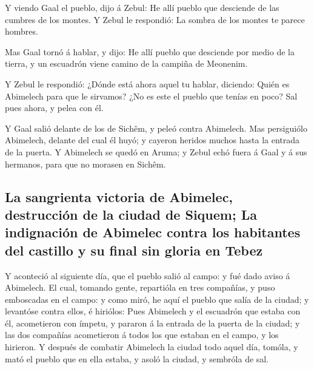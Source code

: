  Y viendo Gaal el pueblo, dijo á Zebul: He allí pueblo
que desciende de las cumbres de los montes. Y Zebul le respondió: La
sombra de los montes te parece hombres.

 Mas Gaal tornó á hablar, y dijo: He allí pueblo que
desciende por medio de la tierra, y un escuadrón viene camino de la
campiña de Meonenim.

 Y Zebul le respondió: ¿Dónde está ahora aquel tu hablar,
diciendo: Quién es Abimelech para que le sirvamos? ¿No es este el pueblo
que tenías en poco? Sal pues ahora, y pelea con él.

 Y Gaal salió delante de los de Sichêm, y peleó contra
Abimelech.  Mas persiguiólo Abimelech, delante del cual
él huyó; y cayeron heridos muchos hasta la entrada de la puerta.
 Y Abimelech se quedó en Aruma; y Zebul echó fuera á Gaal
y á sus hermanos, para que no morasen en Sichêm.

\hypertarget{la-sangrienta-victoria-de-abimelec-destrucciuxf3n-de-la-ciudad-de-siquem-la-indignaciuxf3n-de-abimelec-contra-los-habitantes-del-castillo-y-su-final-sin-gloria-en-tebez}{%
\subsection{La sangrienta victoria de Abimelec, destrucción de la ciudad
de Siquem; La indignación de Abimelec contra los habitantes del castillo
y su final sin gloria en
Tebez}\label{la-sangrienta-victoria-de-abimelec-destrucciuxf3n-de-la-ciudad-de-siquem-la-indignaciuxf3n-de-abimelec-contra-los-habitantes-del-castillo-y-su-final-sin-gloria-en-tebez}}

 Y aconteció al siguiente día, que el pueblo salió al
campo: y fué dado aviso á Abimelech.  El cual, tomando
gente, repartióla en tres compañías, y puso emboscadas en el campo: y
como miró, he aquí el pueblo que salía de la ciudad; y levantóse contra
ellos, é hiriólos:  Pues Abimelech y el escuadrón que
estaba con él, acometieron con ímpetu, y pararon á la entrada de la
puerta de la ciudad; y las dos compañías acometieron á todos los que
estaban en el campo, y los hirieron.  Y después de
combatir Abimelech la ciudad todo aquel día, tomóla, y mató el pueblo
que en ella estaba, y asoló la ciudad, y sembróla de sal.

